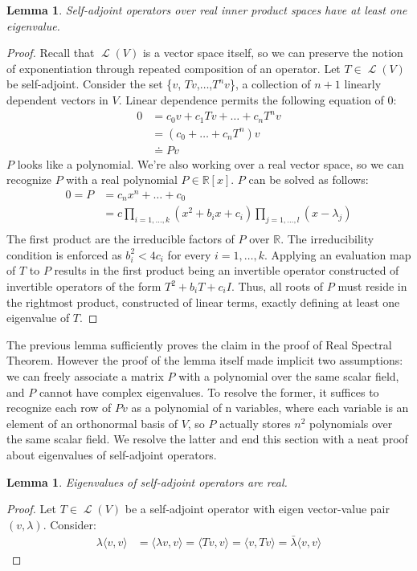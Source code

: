 \documentclass[letterpaper,12pt]{article}
\newtheorem{lemma}[theorem]{Lemma}
\newcommand{\langlerangle}[1]{\langle{#1}\rangle}
\begin{document}
\begin{lemma}
Self-adjoint operators over real inner product spaces have at least one eigenvalue.
\end{lemma}
\begin{proof}
Recall that $\operatorname{\mathcal{L}}(V)$ is a vector space itself, so we can preserve the notion of exponentiation through repeated composition of an operator. Let $T \in \operatorname{\mathcal{L}}(V)$ be self-adjoint. Consider the set \{$v$, $Tv$,$\dots$,$T^{n}v$\}, a collection of $n+1$ linearly dependent vectors in $V$. Linear dependence permits the following equation of 0:
\begin{align*}
    0 &= c_0 v + c_1 Tv +\dots+ c_n T^{n}v\\
      &= (c_0 +\dots+c_n T^{n})v \\
      &\doteq Pv
\end{align*}
$P$ looks like a polynomial. We're also working over a real vector space, so we can recognize $P$ with a real polynomial $P\in \mathbb{R}[x]$. $P$ can be solved as follows:
\begin{align*}
    0 = P &= c_n x^{n} +\dots+c_0 \\
    &= c\prod_{i=1,\dots,k}(x^{2} + b_{i}x + c_{i})\prod_{j=1,\dots,l}(x-\lambda_j) \\ 
\end{align*}
The first product are the irreducible factors of $P$ over $\mathbb{R}$. The irreducibility condition is enforced as $b_{i}^{2}<4c_{i}$ for every $i=1,\dots,k$. Applying an evaluation map of $T$ to $P$ results in the first product being an invertible operator constructed of invertible operators of the form $T^{2} + b_{i}T + c_{i}I$. Thus, all roots of $P$ must reside in the rightmost product, constructed of linear terms, exactly defining at least one eigenvalue of $T$.
\end{proof}
The previous lemma sufficiently proves the claim in the proof of Real Spectral Theorem. However the proof of the lemma itself made implicit two assumptions: we can freely associate a matrix $P$ with a polynomial over the same scalar field, and $P$ cannot have complex eigenvalues. To resolve the former, it suffices to recognize each row of $Pv$ as a polynomial of n variables, where each variable is an element of an orthonormal basis of $V$, so $P$ actually stores $n^{2}$ polynomials over the same scalar field. We resolve the latter and end this section with a neat proof about eigenvalues of self-adjoint operators.
\begin{lemma}
Eigenvalues of self-adjoint operators are real. 
\end{lemma}
\begin{proof}
Let $T \in \operatorname{\mathcal{L}}(V)$ be a self-adjoint operator with eigen vector-value pair $(v, \lambda)$. Consider:
\begin{align*}
    \lambda\langlerangle{v,v} &=
    \langlerangle{\lambda v,v}=\langlerangle{Tv,v}= \langlerangle{v,Tv} =
    \bar{\lambda}\langlerangle{v,v}
\end{align*}
\end{proof}
\end{document}
